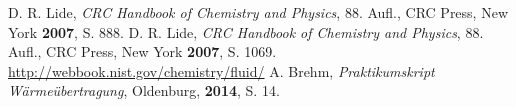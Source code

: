 \documentclass{article}
\begin{document}
\begin{onehalfspace}
\begin{thebibliography}{}
D. R. Lide, \textit{CRC Handbook of Chemistry and Physics}, 88. Aufl., CRC Press, New York \textbf{2007}, S. 888.
D. R. Lide, \textit{CRC Handbook of Chemistry and Physics}, 88. Aufl., CRC Press, New York \textbf{2007}, S. 1069.
\url{http://webbook.nist.gov/chemistry/fluid/}
A. Brehm, \textit{Praktikumskript Wärmeübertragung}, Oldenburg, \textbf{2014},  S. 14.
\end{thebibliography}
\end{onehalfspace}
\end{document}
